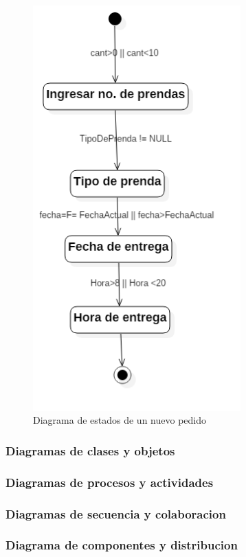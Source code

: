 \begin{figure}[h]
\begin{center}
\includegraphics[width=8cm]{./imagenes/diagramas/Estados_lavanderia2.png}
\end{center}
\caption{Diagrama de estados de un nuevo pedido}
\end{figure}
\newpage

\subsubsection{Diagramas de clases y objetos}




\subsubsection{Diagramas de procesos y actividades}






\subsubsection{Diagramas de secuencia y colaboracion}




\subsubsection{Diagrama de componentes y distribucion}


